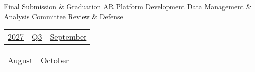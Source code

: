 \vfill{\centering{} \small{Final Submission \& Graduation}\hspace{1.5em} \small{AR Platform Development}\hspace{1.5em} \small{Data Management \& Analysis}\hspace{1.5em} \small{Committee Review \& Defense}\hspace{1.5em}\par}

\pagebreak
{\noindent\Large\renewcommand{\arraystretch}{\myNumArrayStretch}\begin{tabular}{|l|l|l}
\hyperlink{2027}{2027} & \hyperlink{Q3}{Q3} & \hyperlink{September}{September}
\end{tabular}\hfill%
\begin{tabular}{r|r@{}}
\hyperlink{month-2027-8}{August} & \hyperlink{month-2027-10}{October}
\end{tabular}}
\myLineThick
